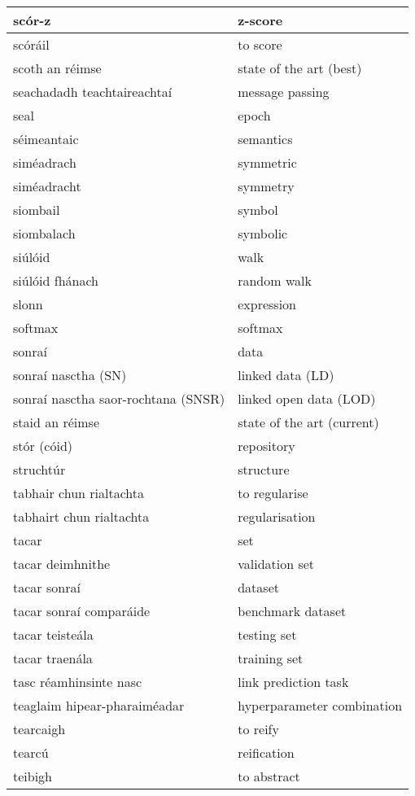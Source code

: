 \begin{longtable}{|l|l|}
		scór-z&z-score\\ \hline 
		scóráil&to score\\ \hline 
		scoth an réimse&state of the art (best)\\ \hline 
		seachadadh teachtaireachtaí&message passing\\ \hline 
		seal&epoch\\ \hline 
		séimeantaic&semantics\\ \hline 
		siméadrach&symmetric\\ \hline 
		siméadracht&symmetry\\ \hline 
		siombail&symbol\\ \hline 
		siombalach&symbolic\\ \hline 
		siúlóid&walk\\ \hline 
		siúlóid fhánach&random walk\\ \hline 
		slonn&expression\\ \hline 
		softmax&softmax\\ \hline 
		sonraí&data\\ \hline 
		sonraí nasctha (SN)&linked data (LD)\\ \hline 
		sonraí nasctha saor-rochtana (SNSR)&linked open data (LOD)\\ \hline 
		staid an réimse&state of the art (current)\\ \hline 
		stór (cóid)&repository\\ \hline 
		struchtúr&structure\\ \hline 
		tabhair chun rialtachta&to regularise\\ \hline 
		tabhairt chun rialtachta&regularisation\\ \hline 
		tacar&set\\ \hline 
		tacar deimhnithe&validation set\\ \hline 
		tacar sonraí&dataset\\ \hline 
		tacar sonraí comparáide&benchmark dataset\\ \hline 
		tacar teisteála&testing set\\ \hline 
		tacar traenála&training set\\ \hline 
		tasc réamhinsinte nasc&link prediction task\\ \hline 
		teaglaim hipear-pharaiméadar&hyperparameter combination\\ \hline 
		tearcaigh&to reify\\ \hline 
		tearcú&reification\\ \hline 
		teibigh&to abstract\\ \hline 

\end{longtable}
